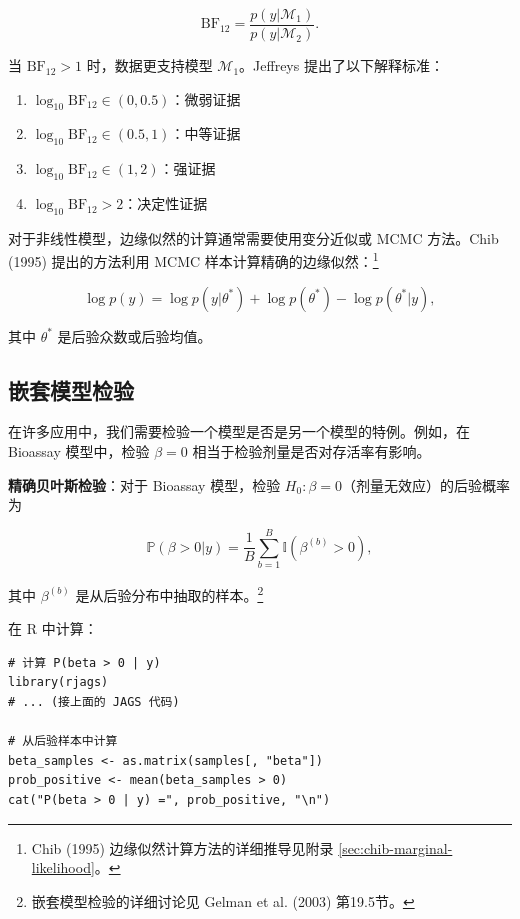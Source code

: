 \begin{equation}
\mathrm{BF}_{12} = \frac{p(y | \mathcal{M}_1)}{p(y | \mathcal{M}_2)}. \label{eq:bayes-factor}
\end{equation}

当 $\mathrm{BF}_{12} > 1$ 时，数据更支持模型 $\mathcal{M}_1$。Jeffreys 提出了以下解释标准：

\begin{enumerate}
  \item $\log_{10} \mathrm{BF}_{12} \in (0, 0.5)$：微弱证据
  \item $\log_{10} \mathrm{BF}_{12} \in (0.5, 1)$：中等证据
  \item $\log_{10} \mathrm{BF}_{12} \in (1, 2)$：强证据
  \item $\log_{10} \mathrm{BF}_{12} > 2$：决定性证据
\end{enumerate}

对于非线性模型，边缘似然的计算通常需要使用变分近似或 MCMC 方法。Chib (1995) 提出的方法利用 MCMC 样本计算精确的边缘似然：\footnote{Chib (1995) 边缘似然计算方法的详细推导见附录 \cref{sec:chib-marginal-likelihood}。}

\begin{equation}
\log p(y) = \log p(y | \theta^*) + \log p(\theta^*) - \log p(\theta^* | y), \label{eq:chib-method}
\end{equation}

其中 $\theta^*$ 是后验众数或后验均值。

\subsection{嵌套模型检验}

在许多应用中，我们需要检验一个模型是否是另一个模型的特例。例如，在 Bioassay 模型中，检验 $\beta = 0$ 相当于检验剂量是否对存活率有影响。

\textbf{精确贝叶斯检验}：对于 Bioassay 模型，检验 $H_0: \beta = 0$（剂量无效应）的后验概率为

\begin{equation}
\mathbb{P}(\beta > 0 | y) = \frac{1}{B} \sum_{b=1}^{B} \mathbb{I}(\beta^{(b)} > 0), \label{eq:bioassay-exact-test}
\end{equation}

其中 $\beta^{(b)}$ 是从后验分布中抽取的样本。\footnote{嵌套模型检验的详细讨论见 Gelman et al. (2003) 第19.5节。}

在 R 中计算：

\begin{verbatim}
# 计算 P(beta > 0 | y)
library(rjags)
# ... (接上面的 JAGS 代码)

# 从后验样本中计算
beta_samples <- as.matrix(samples[, "beta"])
prob_positive <- mean(beta_samples > 0)
cat("P(beta > 0 | y) =", prob_positive, "\n")
\end{verbatim}

